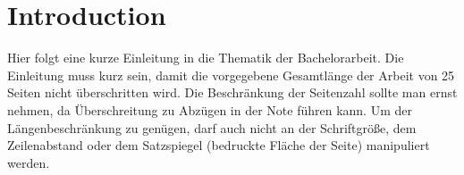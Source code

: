 \chapter{Introduction}
Hier folgt eine kurze Einleitung in die Thematik der Bachelorarbeit.
Die Einleitung muss kurz sein, damit die vorgegebene Gesamtlänge der 
Arbeit von 25 Seiten nicht überschritten wird. 
Die Beschränkung der Seitenzahl sollte man ernst nehmen,
da Überschreitung zu Abzügen in der Note führen kann. 
Um der Längenbeschränkung zu genügen, darf auch nicht an der Schriftgröße,
dem Zeilenabstand oder dem Satzspiegel (bedruckte Fläche der Seite) manipuliert werden.

